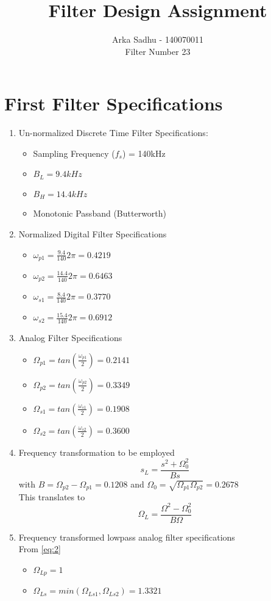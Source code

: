 \documentclass[22pt]{article}
\title{ \huge{\textbf{Filter Design Assignment}}}
\author{
  Arka Sadhu - 140070011\\
  Filter Number 23
}
\begin{document}
\maketitle

\tableofcontents
\newpage
\section{First Filter Specifications}
\begin{enumerate}
\item Un-normalized Discrete Time Filter Specifications:
  \begin{itemize}
  \item Sampling Frequency ($f_s$) = 140kHz
  \item $B_L = 9.4 kHz$
  \item $B_H = 14.4 kHz$
  \item Monotonic Passband (Butterworth)
  \end{itemize}
\item Normalized Digital Filter Specifications
  \begin{itemize}
  \item $\omega_{p1} = \frac{9.4}{140}2\pi = 0.4219$
  \item $\omega_{p2} = \frac{14.4}{140}2\pi = 0.6463$
  \item $\omega_{s1} = \frac{8.4}{140}2\pi = 0.3770$
  \item $\omega_{s2} = \frac{15.4}{140}2\pi = 0.6912$
  \end{itemize}
\item Analog Filter Specifications
  \begin{itemize}
  \item $\Omega_{p1} = tan(\frac{\omega_{p1}}{2}) = 0.2141$ 
  \item $\Omega_{p2} = tan(\frac{\omega_{p2}}{2}) = 0.3349$
  \item $\Omega_{s1} = tan(\frac{\omega_{s1}}{2}) = 0.1908$
  \item $\Omega_{s2} = tan(\frac{\omega_{s2}}{2}) = 0.3600$
  \end{itemize}
\item Frequency transformation to be employed
  \begin{equation}
    \label{eq:1}
    s_L = \frac{s^2 + \Omega_0^2}{Bs}
  \end{equation}
  with $B = \Omega_{p2} - \Omega_{p1} = 0.1208$ and $\Omega_0 = \sqrt{\Omega_{p1}\Omega_{p2}} = 0.2678$
\\  This translates to
  \begin{equation}
    \label{eq:2}
    \Omega_{L} = \frac{\Omega^2 - \Omega_0^2}{B\Omega}
  \end{equation}
\item Frequency transformed lowpass analog filter specifications
  \\From \ref{eq:2}
  \begin{itemize}
  \item $\Omega_{Lp} = 1$
  \item $\Omega_{Ls} = min(\Omega_{Ls1},\Omega_{Ls2}) = 1.3321$
  \end{itemize}


\end{enumerate}
\end{document}
